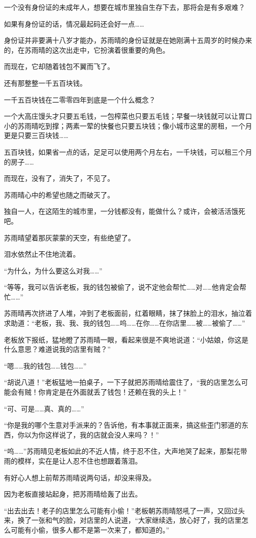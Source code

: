 一个没有身份证的未成年人，想要在城市里独自生存下去，那将会是有多艰难？

如果有身份证的话，情况最起码还会好一点……

身份证并非要满十八岁才能办，苏雨晴的身份证就是在她刚满十五周岁的时候办来的，在苏雨晴的这次出走中，它扮演着很重要的角色。

而现在，它却随着钱包不翼而飞了。

还有那整整一千五百块钱。

一千五百块钱在二零零四年到底是一个什么概念？

一个大高庄馒头才只要五毛钱，一包榨菜也只要五毛钱；早餐一块钱就可以让胃口小的苏雨晴吃到撑；两素一荤的快餐也只要五块钱；像小城市这里的房租，一个月更是只要三百块钱……

五百块钱，如果省一点的话，足足可以使用两个月左右，一千块钱，可以租三个月的房子……

而现在，没有了，消失了，不见了。

苏雨晴心中的希望也随之而破灭了。

独自一人，在这陌生的城市里，一分钱都没有，能做什么？或许，会被活活饿死吧。

苏雨晴望着那灰蒙蒙的天空，有些绝望了。

泪水依然止不住地流着。

“为什么，为什么要这么对我……”

“等等，我可以告诉老板，我的钱包被偷了，说不定他会帮忙……对……他肯定会帮忙……”

苏雨晴再次挤进了人堆，冲到了老板面前，红着眼睛，抹了抹脸上的泪水，抽泣着求助道：“老板，我、我、我的钱包……呜……在你……在你店里……被……被偷了……”

老板放下报纸，猛地瞪了苏雨晴一眼，看起来很是不爽地说道：“小姑娘，你这是什么意思？难道说我的店里有贼？”

“嗯……我的钱包……钱包……”

“胡说八道！”老板猛地一拍桌子，一下子就把苏雨晴给震住了，“我的店里怎么可能会有贼！你肯定是在外面就丢了钱包！还赖在我的头上！”

“可、可是……真、真的……”

“你是我的哪个生意对手派来的？告诉他，有本事就正面来，搞这些歪门邪道的东西，你以为你这样说了，我的店就会没人来吗？！”

“呜……”苏雨晴见老板如此的不近人情，终于忍不住，大声地哭了起来，那梨花带雨的模样，实在是让人忍不住也想跟着落泪。

有好心人想上前帮苏雨晴说两句话，却没来得及。

因为老板直接站起身，把苏雨晴给轰了出去。

“出去出去！老子的店里怎么可能有小偷！”老板朝苏雨晴怒吼了一声，又回过头来，换了一张和气的脸，对店里的人说道，“大家继续选，放心好了，我的店里怎么可能有小偷，很多人都不是第一次来了，都知道的。”

